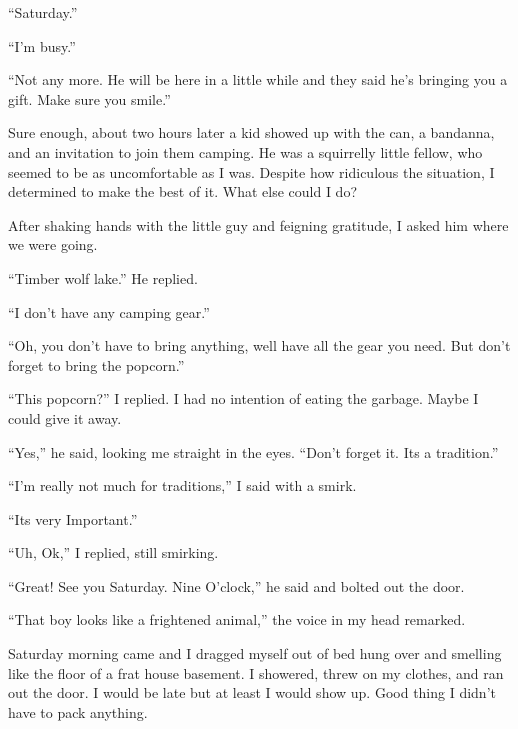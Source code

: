 ``Saturday.''



``I'm busy.''



``Not any more. He will be here in a little while and they said he's
bringing you a gift. Make sure you smile.''



Sure enough, about two hours later a kid showed up with the can, a
bandanna, and an invitation to join them camping. He was a
squirrelly little fellow, who seemed to be as uncomfortable as I
was. Despite how ridiculous the situation, I determined to make the
best of it. What else could I do?



After shaking hands with the little guy and feigning gratitude, I
asked him where we were going.



``Timber wolf lake.'' He replied.



``I don't have any camping gear.''



``Oh, you don't have to bring anything, well have all the gear you
need. But don't forget to bring the popcorn.''



``This popcorn?'' I replied. I had no intention of eating the
garbage. Maybe I could give it away.



``Yes,'' he said, looking me straight in the eyes. ``Don't forget it.
Its a tradition.''



``I'm really not much for traditions,'' I said with a smirk.



``Its very Important.''



``Uh, Ok,'' I replied, still smirking.



``Great! See you Saturday. Nine O'clock,'' he said and bolted out the
door.

``That boy looks like a frightened animal,'' the voice in my head
remarked.



Saturday morning came and I dragged myself out of bed hung over and
smelling like the floor of a frat house basement. I showered, threw
on my clothes, and ran out the door. I would be late but at least I
would show up. Good thing I didn't have to pack anything.



